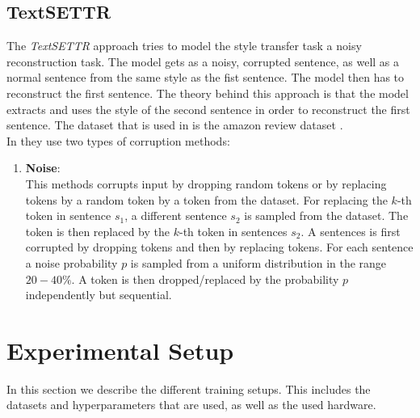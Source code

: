 \documentclass[twocolumn]{tum-article}
\begin{document}
\subsection{TextSETTR}
The \textit{TextSETTR} approach tries to model the style transfer task a noisy reconstruction task. The model gets as a noisy, corrupted sentence, as well as a normal sentence from the same style as the fist sentence. The model then has to reconstruct the first sentence. The theory behind this approach is that the model extracts and uses the style of the second sentence in order to reconstruct the first sentence. The dataset that is used in \cite{riley2020textsettr} is the amazon review dataset \cite{li2018delete}.\\
In \cite{riley2020textsettr} they use two types of corruption methods:
\begin{enumerate}
\item \textbf{Noise}:\\
This methods corrupts input by dropping random tokens or by replacing tokens by a random token by a token from the dataset. For replacing the $k$-th token in sentence $s_1$, a different sentence $s_2$ is sampled from the dataset. The token is then replaced by the $k$-th token in sentences $s_2$. A sentences is first corrupted by dropping tokens and then by replacing tokens. For each sentence a noise probability $p$ is sampled from a uniform distribution in the range $20-40\%$. A token is then dropped/replaced by the probability $p$ independently but sequential.
\end{enumerate}
\section{Experimental Setup}
In this section we describe the different training setups. This includes the datasets and hyperparameters that are used, as well as the used hardware.
\end{document}
